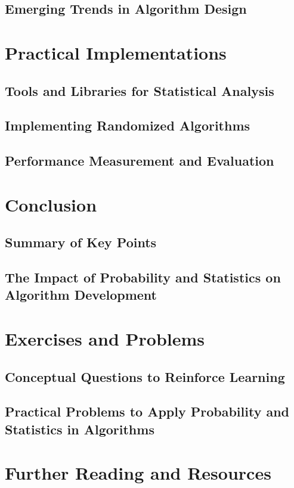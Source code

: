 \documentclass[12pt]{book} %
\begin{document}
\subsection{Emerging Trends in Algorithm Design}

\section{Practical Implementations}
\subsection{Tools and Libraries for Statistical Analysis}
\subsection{Implementing Randomized Algorithms}
\subsection{Performance Measurement and Evaluation}

\section{Conclusion}
\subsection{Summary of Key Points}
\subsection{The Impact of Probability and Statistics on Algorithm Development}

\section{Exercises and Problems}
\subsection{Conceptual Questions to Reinforce Learning}
\subsection{Practical Problems to Apply Probability and Statistics in Algorithms}

\section{Further Reading and Resources}
\end{document}
